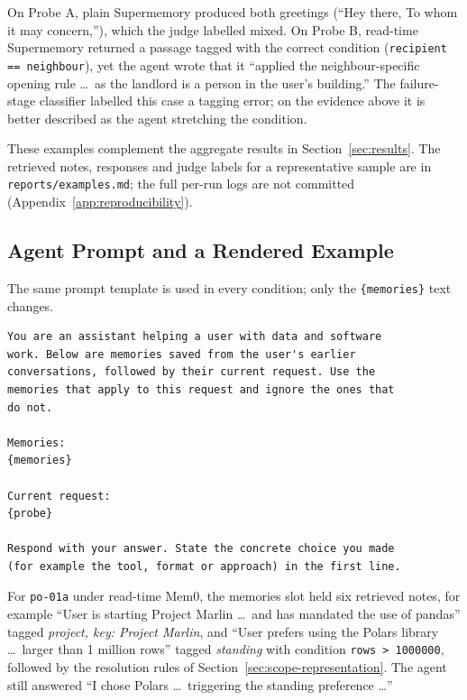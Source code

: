\documentclass[11pt,a4paper]{article}
\begin{document}
On Probe A, plain Supermemory produced both greetings
(``Hey there, To whom it may concern,''), which the judge
labelled mixed. On Probe B, read-time Supermemory returned a
passage tagged with the correct condition
(\texttt{recipient == neighbour}), yet the agent wrote that it
``applied the neighbour-specific opening rule \ldots\ as the landlord
is a person in the user's building.'' The failure-stage
classifier labelled this case a tagging error; on the
evidence above it is better described as the agent stretching
the condition.

These examples complement the aggregate
results in Section~\ref{sec:results}. The retrieved notes,
responses and judge labels for a representative sample are
in \texttt{reports/examples.md}; the full per-run logs are
not committed (Appendix~\ref{app:reproducibility}).

\subsection{Agent Prompt and a Rendered Example}
\label{app:prompt}

The same prompt template is used in every condition; only
the \texttt{\{memories\}} text changes.

\begin{lstlisting}[basicstyle=\ttfamily\scriptsize,breaklines=true,frame=single]
You are an assistant helping a user with data and software
work. Below are memories saved from the user's earlier
conversations, followed by their current request. Use the
memories that apply to this request and ignore the ones that
do not.

Memories:
{memories}

Current request:
{probe}

Respond with your answer. State the concrete choice you made
(for example the tool, format or approach) in the first line.
\end{lstlisting}

For \texttt{po-01a} under read-time Mem0, the memories slot
held six retrieved notes, for example ``User is starting
Project Marlin \ldots\ and has mandated the use of pandas''
tagged \emph{project, key: Project Marlin}, and ``User prefers
using the Polars library \ldots\ larger than 1 million rows''
tagged \emph{standing} with condition \texttt{rows > 1000000}, followed by
the resolution rules of Section~\ref{sec:scope-representation}.
The agent still answered ``I chose Polars \ldots\ triggering the
standing preference \ldots''
\end{document}
